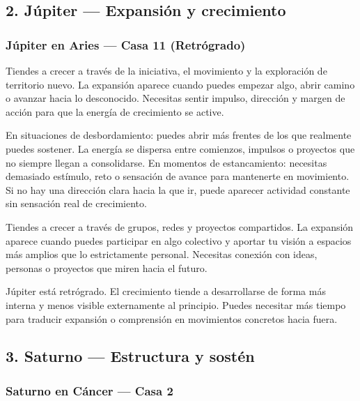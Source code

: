 \documentclass[11pt,a4paper]{article}
\begin{document}
\subsection{2. Júpiter — Expansión y crecimiento}

\subsubsection*{
Júpiter en Aries
— Casa 11 (Retrógrado)
}

Tiendes a crecer a través de la iniciativa, el movimiento y la exploración de territorio nuevo. La expansión aparece cuando puedes empezar algo, abrir camino o avanzar hacia lo desconocido. Necesitas sentir impulso, dirección y margen de acción para que la energía de crecimiento se active.

En situaciones de desbordamiento: puedes abrir más frentes de los que realmente puedes sostener. La energía se dispersa entre comienzos, impulsos o proyectos que no siempre llegan a consolidarse. En momentos de estancamiento: necesitas demasiado estímulo, reto o sensación de avance para mantenerte en movimiento. Si no hay una dirección clara hacia la que ir, puede aparecer actividad constante sin sensación real de crecimiento.

Tiendes a crecer a través de grupos, redes y proyectos compartidos. La expansión aparece cuando puedes participar en algo colectivo y aportar tu visión a espacios más amplios que lo estrictamente personal. Necesitas conexión con ideas, personas o proyectos que miren hacia el futuro.

Júpiter está retrógrado. El crecimiento tiende a desarrollarse de forma más interna y menos visible externamente al principio. Puedes necesitar más tiempo para traducir expansión o comprensión en movimientos concretos hacia fuera.

\vspace{0.8cm}


\subsection{3. Saturno — Estructura y sostén}

\subsubsection*{
Saturno en Cáncer
— Casa 2
}
\end{document}
